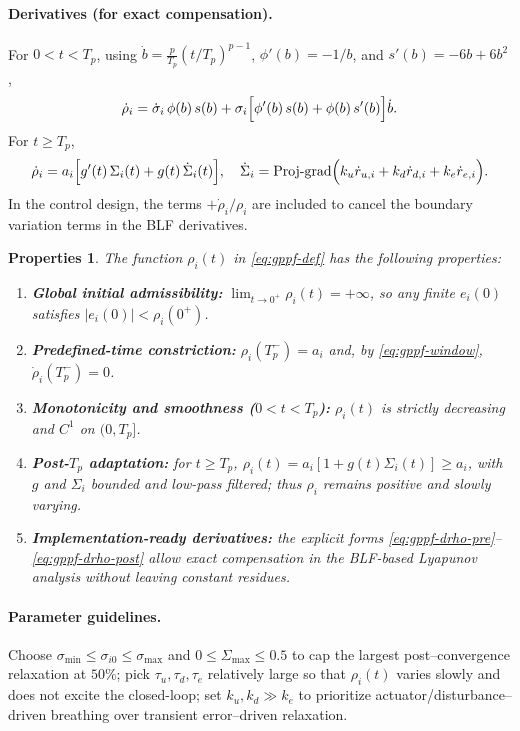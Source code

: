 \documentclass[pdflatex,sn-mathphys-num]{sn-jnl}%
\theoremstyle{thmstyleone}%
\theoremstyle{thmstyletwo}%
\newtheorem{properties}{Properties}%
\theoremstyle{thmstylethree}%
\begin{document}
\paragraph{Derivatives (for exact compensation).}
For $0<t<T_p$, using $\dot b=\frac{p}{T_p}(t/T_p)^{p-1}$, $\phi'(b)=-1/b$, and $s'(b)=-6b+6b^2$,
\begin{equation}\label{eq:gppf-drho-pre}
\dot\rho_i
= \dot\sigma_i\,\phi(b)\,s(b)
+ \sigma_i\Bigl[\phi'(b)\,s(b)+\phi(b)\,s'(b)\Bigr]\dot b .
\end{equation}
For $t\ge T_p$,
\begin{equation}\label{eq:gppf-drho-post}
\dot\rho_i
= a_i\Bigl[g'(t)\,\Sigma_i(t)+g(t)\,\dot\Sigma_i(t)\Bigr],\quad
\dot\Sigma_i=\text{Proj-grad}\Bigl(k_u\dot r_{u,i}+k_d\dot r_{d,i}+k_e\dot r_{e,i}\Bigr).
\end{equation}
In the control design, the terms $+\dot\rho_i/\rho_i$ are included to cancel the boundary variation terms in the BLF derivatives.



\begin{properties}
The function $\rho_i(t)$ in \eqref{eq:gppf-def} has the following properties:
\begin{enumerate}
\item \textbf{Global initial admissibility:} $\displaystyle\lim_{t\to0^+}\rho_i(t)=+\infty$, so any finite $e_i(0)$ satisfies $|e_i(0)|<\rho_i(0^+)$.
\item \textbf{Predefined-time constriction:} $\rho_i(T_p^-)=a_i$ and, by \eqref{eq:gppf-window}, $\dot\rho_i(T_p^-)=0$.
\item \textbf{Monotonicity and smoothness ($0<t<T_p$):} $\rho_i(t)$ is strictly decreasing and $C^1$ on $(0,T_p]$.
\item \textbf{Post-$T_p$ adaptation:} for $t\ge T_p$, $\rho_i(t)=a_i[1+g(t)\Sigma_i(t)]\ge a_i$, with $g$ and $\Sigma_i$ bounded and low-pass filtered; thus $\rho_i$ remains positive and slowly varying.
\item \textbf{Implementation-ready derivatives:} the explicit forms \eqref{eq:gppf-drho-pre}–\eqref{eq:gppf-drho-post} allow exact compensation in the BLF-based Lyapunov analysis without leaving constant residues.
\end{enumerate}
\end{properties}
\paragraph{Parameter guidelines.}
Choose $\sigma_{\min}\le\sigma_{i0}\le\sigma_{\max}$ and $0\le\Sigma_{\max}\le 0.5$ to cap the largest post–convergence relaxation at $50\%$; pick $\tau_u,\tau_d,\tau_e$ relatively large so that $\rho_i(t)$ varies slowly and does not excite the closed-loop; set $k_u,k_d\gg k_e$ to prioritize actuator/disturbance–driven breathing over transient error–driven relaxation.
\end{document}
